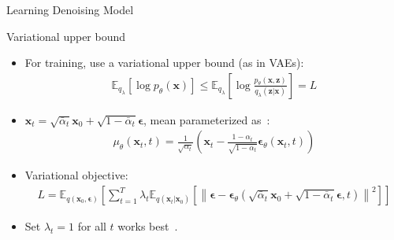 \begin{refsection}
\begin{frame}{Learning Denoising Model}
  \begin{minipage}{1.0\linewidth}
  \centering
  {\color{purple}\scriptsize Variational upper bound}
  \vspace{0.3em}

  \begin{itemize}
    \setlength\itemsep{0.2em}
    \item {\scriptsize For training, use a variational upper bound (as in VAEs):}
    {\scriptsize
    \begin{align*}
      \mathbb{E}_{q_\lambda} [ \log p_\theta(\mathbf{x}) ] \leq \mathbb{E}_{q_\lambda} \left[ \log \frac{p_\theta(\mathbf{x}, \mathbf{z})}{q_\lambda(\mathbf{z}|\mathbf{x})} \right] = L
    \end{align*}
    }
    \item {\scriptsize $\mathbf{x}_t = \sqrt{\bar{\alpha}_t} \mathbf{x}_0 + \sqrt{1 - \bar{\alpha}_t} \boldsymbol{\epsilon}$, mean parameterized as~\parencite{ho2020denoising}:}
    {\scriptsize
    \begin{align*}
      \mu_\theta(\mathbf{x}_t, t) = \frac{1}{\sqrt{\alpha_t}} \left( \mathbf{x}_t - \frac{1 - \alpha_t}{\sqrt{1 - \bar{\alpha}_t}} \boldsymbol{\epsilon}_\theta(\mathbf{x}_t, t) \right)
    \end{align*}
    }
    \item {\scriptsize Variational objective:}
    {\scriptsize
    \begin{align*}
      L = \mathbb{E}_{q(\mathbf{x}_0, \boldsymbol{\epsilon})} \left[ \sum_{t=1}^T \lambda_t \mathbb{E}_{q(\mathbf{x}_t|\mathbf{x}_0)} \left[ \left\| \boldsymbol{\epsilon} - \boldsymbol{\epsilon}_\theta(\sqrt{\bar{\alpha}_t} \mathbf{x}_0 + \sqrt{1 - \bar{\alpha}_t} \boldsymbol{\epsilon}, t) \right\|^2 \right] \right]
    \end{align*}
    }
    \item {\scriptsize Set $\lambda_t=1$ for all $t$ works best~\parencite{ho2020denoising}.}
  \end{itemize}
  \end{minipage}
  \vspace{-0.5em}
  \bottomleftrefs
\end{frame}
\end{refsection}


